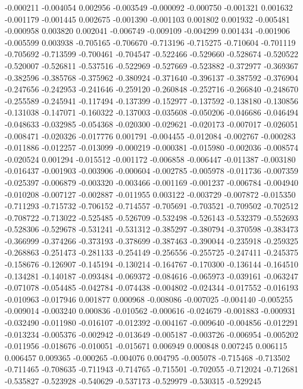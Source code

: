 -0.000211
-0.004054
0.002956
-0.003549
-0.000092
-0.000750
-0.001321
0.001632
-0.001179
-0.001445
0.002675
-0.001390
-0.001103
0.001802
0.001932
-0.005481
-0.000958
0.003820
0.002041
-0.006749
-0.009109
-0.004299
0.001434
-0.001906
-0.005599
0.003938
-0.705165
-0.706670
-0.713196
-0.715275
-0.710604
-0.701119
-0.705692
-0.713599
-0.700461
-0.704547
-0.522466
-0.529660
-0.528674
-0.520522
-0.520007
-0.526811
-0.537516
-0.522969
-0.527669
-0.523882
-0.372977
-0.369367
-0.382596
-0.385768
-0.375962
-0.380924
-0.371640
-0.396137
-0.387592
-0.376904
-0.247656
-0.242953
-0.241646
-0.259120
-0.260848
-0.252716
-0.266840
-0.248670
-0.255589
-0.245941
-0.117494
-0.137399
-0.152977
-0.137592
-0.138180
-0.130856
-0.131038
-0.147071
-0.160322
-0.137003
-0.035608
-0.050206
-0.046686
-0.046494
-0.048633
-0.032985
-0.054368
-0.020300
-0.029621
-0.020173
-0.007017
-0.026051
-0.008471
-0.020326
-0.017776
0.001791
-0.004455
-0.012084
-0.002767
-0.000283
-0.011886
-0.012257
-0.013099
-0.000219
-0.000381
-0.015980
-0.002036
-0.008574
-0.020524
0.001294
-0.015512
-0.001172
-0.006858
-0.006447
-0.011387
-0.003180
-0.016437
-0.001903
-0.003906
-0.000604
-0.002785
-0.005978
-0.011736
-0.007359
-0.025397
-0.006879
-0.003320
-0.003466
-0.001169
-0.001237
-0.006784
-0.004940
-0.010208
-0.007127
-0.002887
-0.011955
0.003122
-0.003729
-0.007872
-0.015350
-0.711293
-0.715732
-0.706152
-0.714557
-0.705691
-0.703521
-0.709502
-0.702512
-0.708722
-0.713022
-0.525485
-0.526709
-0.532498
-0.526143
-0.532379
-0.552693
-0.528306
-0.529678
-0.531241
-0.531312
-0.385297
-0.380794
-0.370598
-0.383473
-0.366999
-0.374266
-0.373193
-0.378699
-0.387463
-0.390044
-0.235918
-0.259325
-0.268863
-0.251473
-0.281133
-0.254149
-0.256556
-0.255725
-0.247411
-0.245375
-0.158676
-0.126907
-0.145194
-0.130214
-0.164767
-0.170300
-0.136144
-0.164510
-0.134281
-0.140187
-0.093484
-0.069372
-0.084616
-0.065973
-0.039161
-0.063247
-0.071078
-0.054485
-0.042784
-0.074438
-0.004802
-0.024344
-0.017552
-0.016193
-0.010963
-0.017946
0.001877
0.000968
-0.008086
-0.007025
-0.004140
-0.005255
-0.009014
-0.003240
0.000836
-0.010562
-0.000616
-0.024679
-0.001883
-0.000931
-0.032490
-0.011980
-0.016107
-0.012392
-0.004167
-0.009640
-0.004856
-0.012291
-0.013234
-0.005376
-0.002942
-0.013649
-0.005187
-0.003726
-0.006954
-0.005202
-0.011956
-0.018676
-0.010051
-0.015671
0.006949
0.000848
0.007245
0.006115
0.006457
0.009365
-0.000265
-0.004076
0.004795
-0.005078
-0.715468
-0.713502
-0.711465
-0.708635
-0.711943
-0.714765
-0.715501
-0.702055
-0.712024
-0.712681
-0.535827
-0.523928
-0.540629
-0.537173
-0.529979
-0.530315
-0.529245

